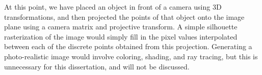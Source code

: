 At this point, we have placed an object in front of a camera using 3D transformations, and then projected the points of that object onto the image plane using a camera matrix and projective transform.
A simple silhouette rasterization of the image would simply fill in the pixel values interpolated between each of the discrete points obtained from this projection.
Generating a photo-realistic image would involve coloring, shading, and ray tracing, but this is unnecessary for this dissertation, and will not be discussed.

